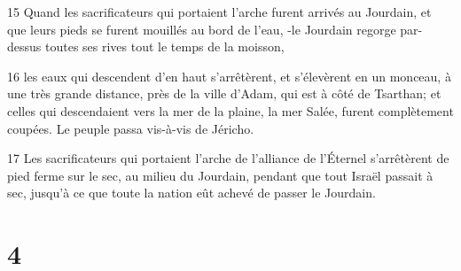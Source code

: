 \par 15 Quand les sacrificateurs qui portaient l'arche furent arrivés au Jourdain, et que leurs pieds se furent mouillés au bord de l'eau, -le Jourdain regorge par-dessus toutes ses rives tout le temps de la moisson,
\par 16 les eaux qui descendent d'en haut s'arrêtèrent, et s'élevèrent en un monceau, à une très grande distance, près de la ville d'Adam, qui est à côté de Tsarthan; et celles qui descendaient vers la mer de la plaine, la mer Salée, furent complètement coupées. Le peuple passa vis-à-vis de Jéricho.
\par 17 Les sacrificateurs qui portaient l'arche de l'alliance de l'Éternel s'arrêtèrent de pied ferme sur le sec, au milieu du Jourdain, pendant que tout Israël passait à sec, jusqu'à ce que toute la nation eût achevé de passer le Jourdain.

\chapter{4}

